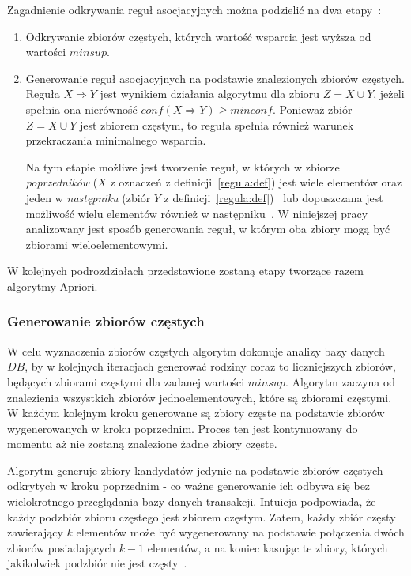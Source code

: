 Zagadnienie odkrywania reguł asocjacyjnych można podzielić na dwa etapy~\cite{Problem:Statement}:
\begin{enumerate}
	\item Odkrywanie zbiorów częstych, których wartość wsparcia jest wyższa od wartości $minsup$.
	\item Generowanie reguł asocjacyjnych na podstawie znalezionych zbiorów częstych. Reguła $X \Rightarrow Y$ jest wynikiem działania algorytmu dla zbioru $Z = X \cup Y$, jeżeli spełnia ona nierówność $conf(X \Rightarrow Y) \geq minconf$. Ponieważ zbiór $Z = X \cup Y$ jest zbiorem częstym, to reguła spełnia również warunek przekraczania minimalnego wsparcia.

	Na tym etapie możliwe jest tworzenie reguł, w których w zbiorze \emph{poprzedników} ($X$ z oznaczeń z definicji~\ref{regula:def}) jest wiele elementów oraz jeden w \emph{następniku} (zbiór $Y$ z definicji~\ref{regula:def})~\cite{Problem:Statement} lub dopuszczana jest możliwość wielu elementów również w następniku~\cite{Apriori:Main}. W niniejszej pracy analizowany jest sposób generowania reguł, w którym oba zbiory mogą być zbiorami wieloelementowymi.
\end{enumerate}

W kolejnych podrozdziałach przedstawione zostaną etapy tworzące razem algorytmy Apriori.

\subsubsection{Generowanie zbiorów częstych}\label{apriori:gen}
W celu wyznaczenia zbiorów częstych algorytm dokonuje analizy bazy danych $DB$, by w kolejnych iteracjach generować rodziny coraz to liczniejszych zbiorów, będących zbiorami częstymi dla zadanej wartości $minsup$. Algorytm zaczyna od znalezienia wszystkich zbiorów jednoelementowych, które są zbiorami częstymi. W każdym kolejnym kroku generowane są zbiory częste na podstawie zbiorów wygenerowanych w kroku poprzednim. Proces ten jest kontynuowany do momentu aż nie zostaną znalezione żadne zbiory częste.

Algorytm generuje zbiory kandydatów jedynie na podstawie zbiorów częstych odkrytych w kroku poprzednim - co ważne generowanie ich odbywa się bez wielokrotnego przeglądania bazy danych transakcji. Intuicja podpowiada, że każdy podzbiór zbioru częstego jest zbiorem częstym. Zatem, każdy zbiór częsty zawierający $k$ elementów może być wygenerowany na podstawie połączenia dwóch zbiorów posiadających $k-1$ elementów, a na koniec kasując te zbiory, których jakikolwiek podzbiór nie jest częsty~\cite{Apriori:Main}.

